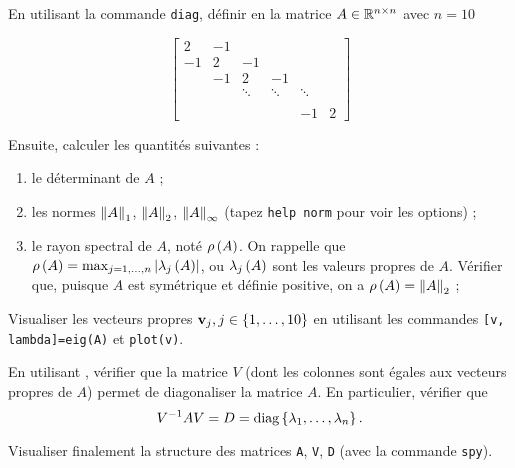 En utilisant la commande \texttt{diag}, définir en \MAT la matrice $A \in \mathbb{R}^{n \times n}$ avec $n = 10$

\begin{equation*}
  \begin{bmatrix}
      2   & -1  &         &         &         &    \\
      -1  & 2   & -1      &         &         &    \\
          & -1  & 2       & -1      &         &    \\
          &     & \ddots  & \ddots  & \ddots  &     \\
          &     &         &         &         &    \\
          &     &         &         &    -1   &  2  
    \end{bmatrix}
\end{equation*}


Ensuite, calculer les quantités suivantes :
\begin{enumerate}
  \item le déterminant de $A$ ;
  \item les normes $\left\lVert A\right\rVert_{1}$, $\left\lVert A\right\rVert_{2}$, $\left\lVert A\right\rVert_{\infty}$ (tapez \texttt{help norm} pour voir les options) ;
  \item le rayon spectral de $A$, noté $\rho \left(A\right)$. On rappelle que $\rho \left(A\right) = \max_{j = 1, \dots, n} \left\lvert\lambda_{j} \left(A\right)\right\rvert$, ou $\lambda_{j} \left(A\right)$ sont les valeurs propres de $A$. Vérifier que, puisque $A$ est symétrique et définie positive, on a $\rho \left(A\right) = \left\lVert A\right\rVert_{2}$ ;
\end{enumerate}

Visualiser les vecteurs propres $\mathbf{v}_{j}, j \in \left\{1, \dots, 10\right\}$ en utilisant les commandes \texttt{[v, lambda]=eig(A)} et \texttt{plot(v)}.


En utilisant \MAT, vérifier que la matrice $V$ (dont les colonnes sont égales aux vecteurs propres de $A$) permet de diagonaliser la matrice $A$. En particulier, vérifier que
\begin{equation*}
  V^{-1} A V = D = \text{diag} \left\{\lambda_{1}, \dots, \lambda_{n}\right\}.
\end{equation*}


Visualiser finalement la structure des matrices \texttt{A}, \texttt{V}, \texttt{D} (avec la commande \texttt{spy}).

